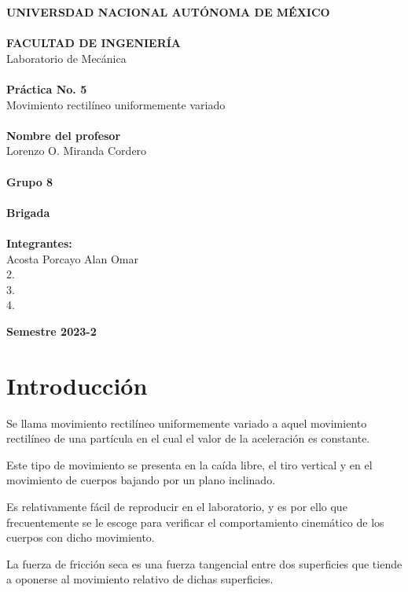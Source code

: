 \documentclass[12pt, titlepage]{report}
\begin{document}
\begin{titlepage}
\begin{center}
            \large \textbf{UNIVERSDAD NACIONAL AUTÓNOMA DE MÉXICO\\}
            \large \textbf{\\FACULTAD DE INGENIERÍA\\} 
            \hfill \break
            \large Laboratorio de Mecánica\\
            \Large \textbf{\\Práctica No. 5\\}
            \large Movimiento rectilíneo uniformemente variado\\
            \Large \textbf{\\Nombre del profesor\\}
            \large Lorenzo O. Miranda Cordero\\
            \Large \textbf{\\Grupo 8\\}
            \Large \textbf{\\Brigada \\}
            \Large \textbf{\\Integrantes:\\}
            \Large Acosta Porcayo Alan Omar\\2. \\3. \\4. \\
        \end{center}
        \begin{flushright}
            \Large \textbf{Semestre 2023-2}
        \end{flushright}
    \end{titlepage}

    \section*{Introducción}
    Se llama movimiento rectilíneo uniformemente variado a aquel movimiento rectilíneo de una partícula en el cual el valor de la aceleración es constante.

    Este tipo de movimiento se presenta en la caída libre, el tiro vertical y en el movimiento de cuerpos bajando por un plano inclinado.

    Es relativamente fácil de reproducir en el laboratorio, y es por ello que frecuentemente se le escoge para verificar el comportamiento cinemático de los cuerpos con dicho movimiento.

    La fuerza de fricción seca es una fuerza tangencial entre dos superficies que tiende a oponerse al movimiento relativo de dichas superficies.
\end{document}
